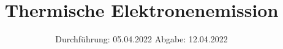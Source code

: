 

\subject{V504}
\title{Thermische Elektronenemission}
\date{
  Durchführung: 05.04.2022
  \hspace{3em}
  Abgabe: 12.04.2022
}



\maketitle
\thispagestyle{empty}
\tableofcontents
\newpage








\newpage
\printbibliography{}
\nocite{matplotlib}
\nocite{numpy}
\nocite{scipy}
\nocite{uncertainties}
\nocite{reback2020pandas}


